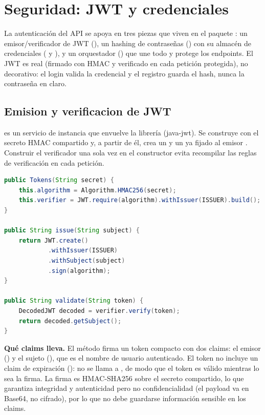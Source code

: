\section{Seguridad: JWT y credenciales}

La autenticación del API se apoya en tres piezas que viven en el paquete
: un emisor/verificador de JWT (),
un hashing de contraseñas () con su almacén de
credenciales ( y
), y un orquestador
() que une todo y protege los endpoints. El
JWT es real (firmado con HMAC y verificado en cada petición protegida), no
decorativo: el login valida la credencial y el registro guarda el hash, nunca la
contraseña en claro.

\subsection{Emision y verificacion de JWT}

 es un servicio de instancia que envuelve la
librería  (java-jwt). Se construye con el secreto HMAC
compartido y, a partir de él, crea un  y un
 ya fijado al emisor . Construir el
verificador una sola vez en el constructor evita recompilar las reglas de
verificación en cada petición.

\begin{lstlisting}[language=Java,caption={Tokens: constructor, emision y validacion}]
public Tokens(String secret) {
    this.algorithm = Algorithm.HMAC256(secret);
    this.verifier = JWT.require(algorithm).withIssuer(ISSUER).build();
}

public String issue(String subject) {
    return JWT.create()
            .withIssuer(ISSUER)
            .withSubject(subject)
            .sign(algorithm);
}

public String validate(String token) {
    DecodedJWT decoded = verifier.verify(token);
    return decoded.getSubject();
}
\end{lstlisting}

\textbf{Qué claims lleva.} El método  firma un token
compacto con dos claims: el emisor () y el sujeto
(), que es el nombre de usuario autenticado. El token no incluye un
claim de expiración (): no se llama a , de modo
que el token es válido mientras lo sea la firma. La firma es HMAC-SHA256 sobre el
secreto compartido, lo que garantiza integridad y autenticidad pero no
confidencialidad (el payload va en Base64, no cifrado), por lo que no debe
guardarse información sensible en los claims.

